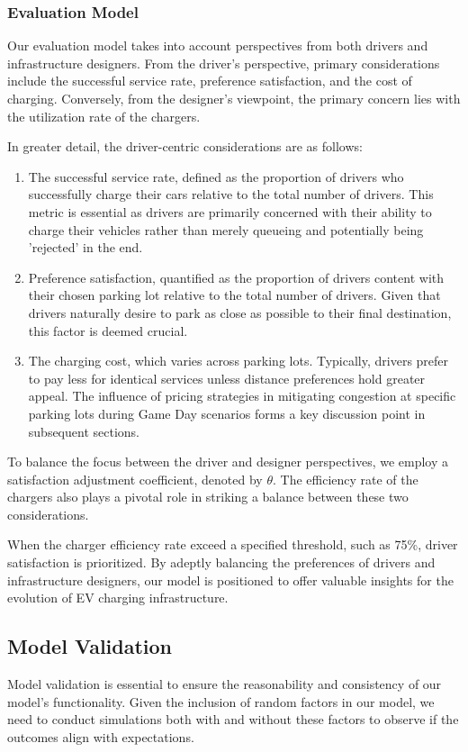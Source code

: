 \subsubsection{Evaluation Model}
Our evaluation model takes into account perspectives from both drivers and infrastructure designers. From the driver's perspective, primary considerations include the successful service rate, preference satisfaction, and the cost of charging. Conversely, from the designer's viewpoint, the primary concern lies with the utilization rate of the chargers.

In greater detail, the driver-centric considerations are as follows:
\begin{enumerate}
    \item The successful service rate, defined as the proportion of drivers who successfully charge their cars relative to the total number of drivers. This metric is essential as drivers are primarily concerned with their ability to charge their vehicles rather than merely queueing and potentially being 'rejected' in the end.

    \item Preference satisfaction, quantified as the proportion of drivers content with their chosen parking lot relative to the total number of drivers. Given that drivers naturally desire to park as close as possible to their final destination, this factor is deemed crucial.

    \item The charging cost, which varies across parking lots. Typically, drivers prefer to pay less for identical services unless distance preferences hold greater appeal. The influence of pricing strategies in mitigating congestion at specific parking lots during Game Day scenarios forms a key discussion point in subsequent sections.
\end{enumerate}

To balance the focus between the driver and designer perspectives, we employ a satisfaction adjustment coefficient, denoted by $\theta$. The efficiency rate of the chargers also plays a pivotal role in striking a balance between these two considerations.

When the charger efficiency rate exceed a specified threshold, such as 75\%, driver satisfaction is prioritized. By adeptly balancing the preferences of drivers and infrastructure designers, our model is positioned to offer valuable insights for the evolution of EV charging infrastructure.

\subsection{Model Validation}
Model validation is essential to ensure the reasonability and consistency of our model's functionality. Given the inclusion of random factors in our model, we need to conduct simulations both with and without these factors to observe if the outcomes align with expectations.

